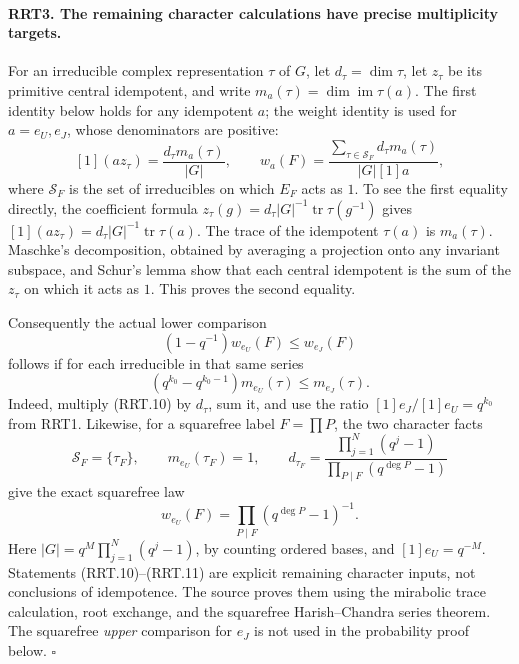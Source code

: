 \documentclass[11pt,a4paper]{article}
\numberwithin{equation}{section}
\theoremstyle{remark}\newtheorem{remark}[theorem]{Remark}
\begin{document}
\paragraph{RRT3. The remaining character calculations have precise multiplicity targets.}
\label{claim:RRT3}
For an irreducible complex representation $\tau$ of $G$, let
$d_\tau=\dim\tau$, let $z_\tau$ be its primitive central
idempotent, and write $m_a(\tau)=\dim\operatorname{im}\tau(a)$.
The first identity below holds for any idempotent $a$; the
weight identity is used for $a=e_U,\allowbreak{} e_J$, whose denominators
are positive:
\[
 [1](az_\tau)=\frac{d_\tau m_a(\tau)}{|G|},\qquad
 w_a(F)=\frac{\sum_{\tau\in\mathcal S_F}d_\tau m_a(\tau)}
                                      {|G|[1]a},
 \tag{RRT.8}
\]
where $\mathcal S_F$ is the set of irreducibles on which $E_F$
acts as $1$.  To see the first equality directly, the coefficient
formula
$z_\tau(g)=d_\tau|G|^{-1}\operatorname{tr}\tau(g^{-1})$
gives $[1](az_\tau)=d_\tau|G|^{-1}\operatorname{tr}\tau(a)$.
The trace of the idempotent $\tau(a)$ is $m_a(\tau)$.
Maschke's decomposition, obtained by averaging a projection onto
any invariant subspace, and Schur's lemma show that each central
idempotent is the sum of the $z_\tau$ on which it acts as $1$.
This proves the second equality.

Consequently the actual lower comparison
\[
       (1-q^{-1})w_{e_U}(F)\le w_{e_J}(F)
 \tag{RRT.9}
\]
follows if for each irreducible in that same series
\[
       (q^{k_0}-q^{k_0-1})m_{e_U}(\tau)\le m_{e_J}(\tau).
 \tag{RRT.10}
\]
Indeed, multiply (RRT.10) by $d_\tau$, sum it, and use the
ratio $[1]e_J/[1]e_U=q^{k_0}$ from RRT1.
Likewise, for a squarefree label $F=\prod P$, the two character
facts
\[
 \mathcal S_F=\{\tau_F\},\qquad
 m_{e_U}(\tau_F)=1,\qquad
 d_{\tau_F}=\frac{\prod_{j=1}^N(q^j-1)}{\prod_{P\mid F}(q^{\deg P}-1)}
 \tag{RRT.11}
\]
give the exact squarefree law
\[
                w_{e_U}(F)=\prod_{P\mid F}(q^{\deg P}-1)^{-1}.
 \tag{RRT.12}
\]
Here $|G|=q^M\prod_{j=1}^N(q^j-1)$, by counting ordered
bases, and $[1]e_U=q^{-M}$.  Statements (RRT.10)--(RRT.11)
are explicit remaining character inputs, not conclusions of
idempotence.  The source proves them using the mirabolic trace
calculation, root exchange, and the squarefree Harish--Chandra
series theorem.  The squarefree \emph{upper} comparison for $e_J$
is not used in the probability proof below.
\hfill$\square$

\end{document}

